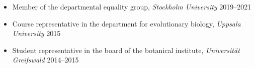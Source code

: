 \documentclass[11pt]{article}
\begin{document}
\vspace{-0.175cm}
\begin{itemize}[label={},itemindent=-9pt,leftmargin=24pt]
	\itemsep-0.1cm
	\item Member of the departmental equality group, \textit{Stockholm University}  \hfill 2019--2021
	\item Course representative in the department for evolutionary biology, \textit{Uppsala University} \hfill 2015
	\item Student representative in the board of the botanical institute, \textit{Universität Greifswald} \hfill 2014--2015
\end{itemize}
\end{document}
